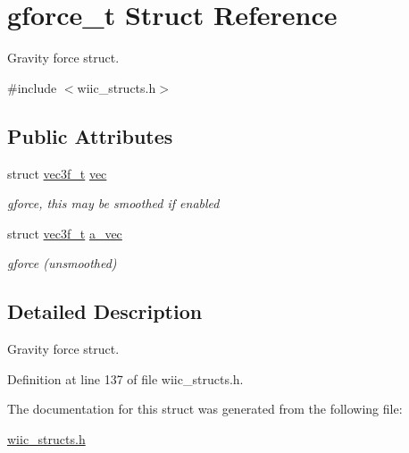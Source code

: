 \hypertarget{structgforce__t}{\section{gforce\-\_\-t Struct Reference}
\label{structgforce__t}
}


Gravity force struct.  




{\ttfamily \#include $<$wiic\-\_\-structs.\-h$>$}

\subsection*{Public Attributes}
\begin{DoxyCompactItemize}
\item 
\hypertarget{structgforce__t_a97f8ca8f50cd68fd5c5e9530758c461e}{struct \hyperlink{structvec3f__t}{vec3f\-\_\-t} \hyperlink{structgforce__t_a97f8ca8f50cd68fd5c5e9530758c461e}{vec}}\label{structgforce__t_a97f8ca8f50cd68fd5c5e9530758c461e}

\begin{DoxyCompactList}\small\item\em gforce, this may be smoothed if enabled \end{DoxyCompactList}\item 
\hypertarget{structgforce__t_a51f24cbec42c9cb0027c510eaa7c8f46}{struct \hyperlink{structvec3f__t}{vec3f\-\_\-t} \hyperlink{structgforce__t_a51f24cbec42c9cb0027c510eaa7c8f46}{a\-\_\-vec}}\label{structgforce__t_a51f24cbec42c9cb0027c510eaa7c8f46}

\begin{DoxyCompactList}\small\item\em gforce (unsmoothed) \end{DoxyCompactList}\end{DoxyCompactItemize}


\subsection{Detailed Description}
Gravity force struct. 

Definition at line 137 of file wiic\-\_\-structs.\-h.



The documentation for this struct was generated from the following file\-:\begin{DoxyCompactItemize}
\item 
\hyperlink{wiic__structs_8h}{wiic\-\_\-structs.\-h}\end{DoxyCompactItemize}
